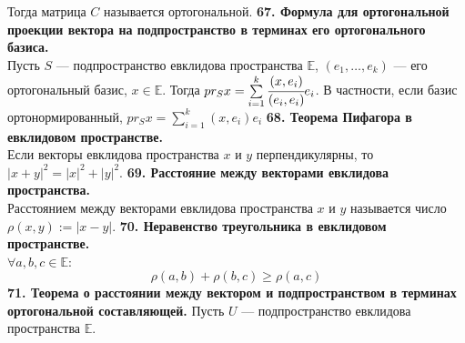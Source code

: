 \documentclass{article}
\begin{document}
Тогда матрица $C$ называется ортогональной.
\newline
\newline
\textbf{67. Формула для ортогональной проекции вектора на подпространство в терминах его ортогонального базиса.}\\
Пусть $S$ --- подпространство евклидова пространства $\mathbb{E}$, $(e_1, \ldots, e_k)$ --- его ортогональный базис, $x \in \mathbb{E}$.
Тогда $pr_S x = \sum\limits_{i = 1}^{k}\cfrac{(x,e_i)}{(e_i, e_i)}e_i$. В частности, если базис ортонормированный, $pr_S x = \sum\limits_{i = 1}^{k}(x,e_i)e_i$
\newline
\newline
\textbf{68. Теорема Пифагора в евклидовом пространстве.}\\
Если векторы евклидова пространства $x$ и $y$ перпендикулярны, то $|x+y|^2 = |x|^2 + |y|^2$.
\newline
\newline
\textbf{69. Расстояние между векторами евклидова пространства.}\\
Расстоянием между векторами евклидова пространства $x$ и $y$ называется число \\$\rho(x,y) := |x-y|$.
\newline
\newline
\textbf{70. Неравенство треугольника в евклидовом пространстве.}\\
$\forall a,b,c \in \mathbb{E}$:
$$\rho(a,b)+\rho(b,c) \ge \rho(a,c)$$
\newline
\newline
\textbf{71. Теорема о расстоянии между вектором и подпространством в терминах ортогональной составляющей.}
Пусть $U$ --- подпространство евклидова пространства $\mathbb{E}$.
\end{document}
